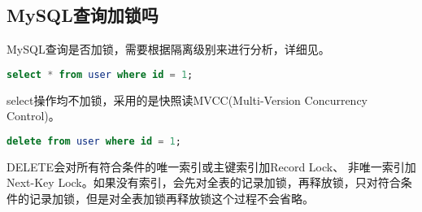 \documentclass[../../../interview-questions.tex]{subfiles}
\begin{document}
\subsection{MySQL查询加锁吗}

MySQL查询是否加锁，需要根据隔离级别来进行分析，详细见。

\begin{lstlisting}[language=SQL]
select * from user where id = 1;
\end{lstlisting}

select操作均不加锁，采用的是快照读MVCC(Multi-Version Concurrency Control)。

\begin{lstlisting}[language=SQL]
delete from user where id = 1;
\end{lstlisting}

DELETE会对所有符合条件的唯一索引或主键索引加Record Lock、 非唯一索引加Next-Key Lock。如果没有索引，会先对全表的记录加锁，再释放锁，只对符合条件的记录加锁，但是对全表加锁再释放锁这个过程不会省略。
\end{document}
